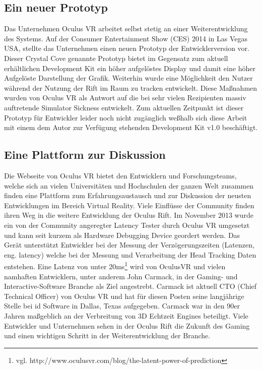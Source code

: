 \documentclass[pagesize, paper=a4, fontsize=12pt,titlepage=true, headings=small, headnosepline, abstractoff, liststotoc, nochapterprefix, plainheadsepline, twoside]{scrreprt}
\begin{document}
\subsection{Ein neuer Prototyp}\label{CrystalCove}
Das Unternehmen Oculus VR arbeitet selbst stetig an einer Weiterentwicklung des Systems. Auf der Consumer Entertainment Show (CES) 2014 in Las Vegas USA, stellte das Unternehmen einen neuen Prototyp der Entwicklerversion vor. Dieser Crystal Cove genannte Prototyp bietet im Gegensatz zum aktuell erhältlichen Development Kit ein höher aufgelöstes Display und damit eine höher Aufgelöste Darstellung der Grafik. Weiterhin wurde eine Möglichkeit den Nutzer während der Nutzung der Rift im Raum zu tracken entwickelt. Diese Maßnahmen wurden von Oculus VR als Antwort auf die bei sehr vielen Rezipienten massiv auftretende Simulator Sickness entwickelt. Zum aktuellen Zeitpunkt ist dieser Prototyp für Entwickler leider noch nicht zugänglich weßhalb sich diese Arbeit mit einem dem Autor zur Verfügung stehenden Development Kit v1.0 beschäftigt.

\subsection{Eine Plattform zur Diskussion}
Die Webseite von Oculus VR bietet den Entwicklern und Forschungsteams, welche sich an vielen Universitäten und Hochschulen der ganzen Welt zusammen finden eine Plattform zum Erfahrungsaustausch und zur Diskussion der neusten Entwicklungen im Bereich Virtual Reality. Viele Einflüsse der Community finden ihren Weg in die weitere Entwicklung der Oculus Rift. Im November 2013 wurde ein von der Community angeregter Latency Tester durch Oculus VR umgesetzt und kann seit kurzem als Hardware Debugging Device geordert werden. Das Gerät unterstützt Entwickler bei der Messung der Verzögerungszeiten (Latenzen, eng. latency) welche bei der Messung und Verarbeitung der Head Tracking Daten entstehen. Eine Latenz von unter 20ms\footnote{vgl. http://www.oculusvr.com/blog/the-latent-power-of-prediction} wird von OculusVR und vielen namhaften Entwicklern, unter anderem John Carmack, in der Gaming- und Interactive-Software Branche als Ziel angestrebt. Carmack ist aktuell CTO (Chief Technical Officer) von Oculus VR und hat für diesen Posten seine langjährige Stelle bei id Software in Dallas, Texas aufgegeben. Carmack war in den 90er Jahren maßgeblich an der Verbreitung von 3D Echtzeit Engines beteiligt. Viele Entwickler und Unternehmen sehen in der Oculus Rift die Zukunft des Gaming und einen wichtigen Schritt in der Weiterentwicklung der Branche.
\end{document}
